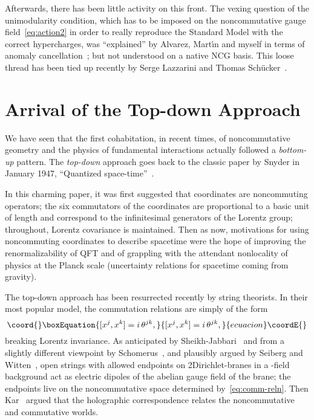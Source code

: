 \documentclass[a4paper,12pt]{article}
\providecommand{\1}{\mathbf{1}}         %
\providecommand{\7}{\dagger}            %
\providecommand{\8}{\bullet}            %
\renewcommand{\.}{\cdot}            %
\renewcommand{\:}{\colon}           %
\begin{document}
Afterwards, there has been little activity on this front. The vexing
question of the unimodularity condition, which has to be imposed on
the noncommutative gauge field~\eqref{eq:action2} in order to really
reproduce the Standard Model with the correct hypercharges, was
``explained'' by Alvarez, Mart\'{\i}n and myself in terms of anomaly
cancellation~\cite{Chiron}; but not understood on a native NCG basis.
This loose thread has been tied up recently by Serge Lazzarini and
Thomas Sch\"ucker~\cite{LazzariniS}.



\section{Arrival of the Top-down Approach}

We have seen that the first cohabitation, in recent times, of
noncommutative geometry and the physics of fundamental interactions
actually followed a \textit{bottom-up} pattern. The \textit{top-down}
approach goes back to the classic paper by Snyder in January 1947,
``Quantized space-time''~\cite{Snyder}.

In this charming paper, it was first suggested that coordinates are
noncommuting operators; the six commutators of the coordinates are
proportional to a basic unit of length and correspond to the
infinitesimal generators of the Lorentz group; throughout, Lorentz
covariance is maintained. Then as now, motivations for using
noncommuting coordinates to describe spacetime were the hope of
improving the renormalizability of QFT and of grappling with the
attendant nonlocality of physics at the Planck scale (uncertainty
relations for spacetime coming from gravity).

The top-down approach has been resurrected recently by string
theorists. In their most popular model, the commutation relations are
simply of the form
\begin{equation}\coord{}\boxEquation{
[x^j, x^k] = i\, \theta^{jk},
\label{eq:comm-reln}
}{
[x^j, x^k] = i\, \theta^{jk},
}{ecuacion}\coordE{}\end{equation}
breaking Lorentz invariance. As anticipated by
Sheikh-Jabbari~\cite{Jabbari} and from a slightly different viewpoint
by Schomerus~\cite{Schomerus}, and plausibly argued by Seiberg and
Witten~\cite{SeibergW}, open strings with allowed endpoints on
2Dirich\-let-branes in a \coordHE{}-field background act as electric dipoles
of the abelian gauge field of the brane; the endpoints live on the
noncommutative space determined by~\eqref{eq:comm-reln}. Then
Kar~\cite{Kar} argued that the holographic correspondence relates the
noncommutative and commutative worlds.
\end{document}
